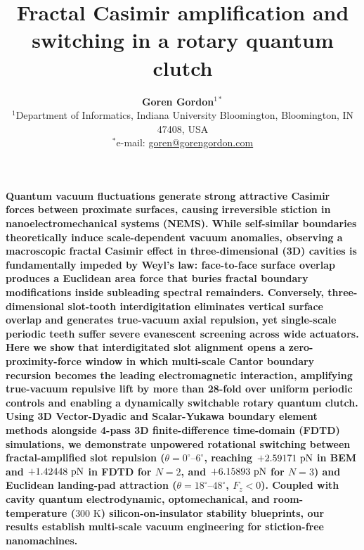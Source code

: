 \documentclass[11pt,letterpaper]{article}
\title{\textbf{Fractal Casimir amplification and switching in a rotary quantum clutch}}
\author{\textbf{Goren Gordon}$^{1\ast}$ \\
\normalsize{$^{1}$Department of Informatics, Indiana University Bloomington, Bloomington, IN 47408, USA} \\
\normalsize{$^{\ast}$e-mail: \href{mailto:goren@gorengordon.com}{goren@gorengordon.com}}}
\date{}
\begin{document}
\maketitle

\noindent\textbf{%
Quantum vacuum fluctuations generate strong attractive Casimir forces between proximate surfaces, causing irreversible stiction in nanoelectromechanical systems (NEMS)\cite{casimir1948,rodriguez2011}. While self-similar boundaries theoretically induce scale-dependent vacuum anomalies\cite{shajesh2016,gordon2026prd}, observing a macroscopic fractal Casimir effect in three-dimensional (3D) cavities is fundamentally impeded by Weyl's law: face-to-face surface overlap produces a Euclidean area force that buries fractal boundary modifications inside subleading spectral remainders\cite{lapidus1991}. Conversely, three-dimensional slot-tooth interdigitation eliminates vertical surface overlap and generates true-vacuum axial repulsion\cite{levin2010}, yet single-scale periodic teeth suffer severe evanescent screening across wide actuators. Here we show that interdigitated slot alignment opens a zero-proximity-force window in which multi-scale Cantor boundary recursion becomes the leading electromagnetic interaction, amplifying true-vacuum repulsive lift by more than 28-fold over uniform periodic controls and enabling a dynamically switchable rotary quantum clutch. Using 3D Vector-Dyadic and Scalar-Yukawa boundary element methods alongside 4-pass 3D finite-difference time-domain (FDTD) simulations, we demonstrate unpowered rotational switching between fractal-amplified slot repulsion ($\theta = 0^\circ\text{--}6^\circ$, reaching $+2.59171{}\text{ pN}$ in BEM and $+1.42448{}\text{ pN}$ in FDTD for $N=2$, and $+6.15893{}\text{ pN}$ for $N=3$) and Euclidean landing-pad attraction ($\theta = 18^\circ\text{--}48^\circ$, $F_z < 0$). Coupled with cavity quantum electrodynamic, optomechanical, and room-temperature ($300\text{ K}$) silicon-on-insulator stability blueprints, our results establish multi-scale vacuum engineering for stiction-free nanomachines.}

\vspace{1em}
\end{document}
